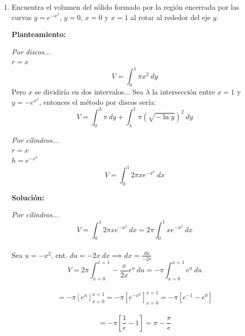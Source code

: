 \documentclass[10pt,letterpaper]{article}
\begin{document}
\begin{enumerate}

\item Encuentra el volumen del sólido formado por la región encerrada por las curvas $y=e^{-x^2}$,
      $y=0$, $x=0$ y $x=1$ al rotar al rededor del eje $y$.

\begin{multicols}{2}


\textbf{Planteamiento:}

\textit{Por discos...} \\
$r = x$
$$V = \int_{0}^{1} \pi x^2\ dy$$
Pero $x$ se dividiría en dos intervalos... Sea $\lambda$ la intersección entre $x=1$ y $y=-e^{x^2}$,
entonces el método por discos sería:\\
$$V = \int_{0}^{\lambda} \pi\ dy + \int_{\lambda}^{1} \pi( \sqrt{-\ln{y}} )^2\ dy $$

\textit{Por cilindros...} \\
$r = x$ \\
$h = e^{-x^2}$
$$V = \int_{0}^{1} 2 \pi x e^{-x^2}\ dx$$

\textbf{Solución:}

\textit{Por cilindros...}
$$V = \int_{0}^{1} 2 \pi x e^{-x^2}\ dx = 2\pi \int_{0}^{1} x e^{-x^2}\ dx$$ \\
Sea $u = -x^2$, ent. $du = -2x\ dx \implies dx = \frac{du}{-2x}$
$$V = 2\pi \int_{x=0}^{x=1} -\frac{x}{2x} e^u\ du = -\pi \int_{x=0}^{x=1} e^u\ du$$ \\
$$= -\pi[e^u]_{x=0}^{x=1} = -\pi[e^{-x^2}]_{x=0}^{x=1} = -\pi[e^{-1}-e^0]$$ \\
$$= -\pi[\frac{1}{e}-1] = \pi - \frac{\pi}{e}$$


\end{multicols}
\end{enumerate}
\end{document}
